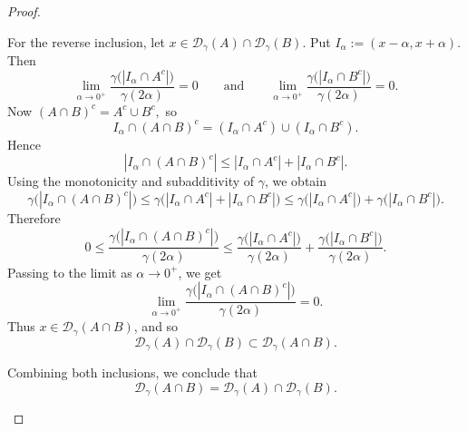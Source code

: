 \documentclass{amsart}
\theoremstyle{plain}
\numberwithin{equation}{section}
\begin{document}
\begin{proof}
\begin{enumerate}
For the reverse inclusion, let $x\in \mathcal{D}_\gamma(A)\cap \mathcal{D}_\gamma(B)$. Put $ I_\alpha:=(x-\alpha,x+\alpha).$
Then
$$
\lim_{\alpha\to0^+}
\frac{\gamma\bigl(|I_\alpha\cap A^c|\bigr)}{\gamma(2\alpha)}=0
\qquad\text{and}\qquad
\lim_{\alpha\to0^+}
\frac{\gamma\bigl(|I_\alpha\cap B^c|\bigr)}{\gamma(2\alpha)}=0.
$$
Now $ (A\cap B)^c=A^c\cup B^c, $
so
$$
I_\alpha\cap (A\cap B)^c
=
(I_\alpha\cap A^c)\cup(I_\alpha\cap B^c).
$$
Hence
$$
|I_\alpha\cap (A\cap B)^c|
\le
|I_\alpha\cap A^c|+|I_\alpha\cap B^c|.
$$
Using the monotonicity and subadditivity of $\gamma$, we obtain
$$
\gamma\bigl(|I_\alpha\cap (A\cap B)^c|\bigr)
\le
\gamma\bigl(|I_\alpha\cap A^c|+|I_\alpha\cap B^c|\bigr)
\le
\gamma\bigl(|I_\alpha\cap A^c|\bigr)+\gamma\bigl(|I_\alpha\cap B^c|\bigr).
$$
Therefore
$$
0\le
\frac{\gamma\bigl(|I_\alpha\cap (A\cap B)^c|\bigr)}{\gamma(2\alpha)}
\le
\frac{\gamma\bigl(|I_\alpha\cap A^c|\bigr)}{\gamma(2\alpha)}
+
\frac{\gamma\bigl(|I_\alpha\cap B^c|\bigr)}{\gamma(2\alpha)}.
$$
Passing to the limit as $\alpha\to0^+$, we get
$$
\lim_{\alpha\to0^+}
\frac{\gamma\bigl(|I_\alpha\cap (A\cap B)^c|\bigr)}{\gamma(2\alpha)}
=0.
$$ Thus $x\in \mathcal{D}_\gamma(A\cap B)$, and so $$ \mathcal{D}_\gamma(A)\cap \mathcal{D}_\gamma(B)\subset \mathcal{D}_\gamma(A\cap B).$$
 
Combining both inclusions, we conclude that
$$ \mathcal{D}_\gamma(A\cap B)=\mathcal{D}_\gamma(A)\cap \mathcal{D}_\gamma(B).$$
\end{enumerate}
\end{proof}
\end{document}
